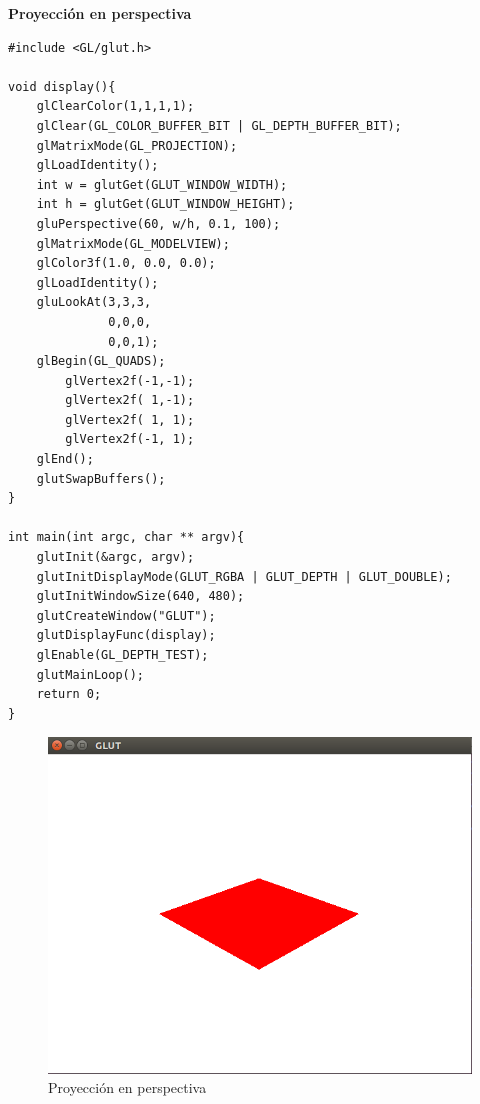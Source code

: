 \documentclass[a4paper,12pt]{article}
\begin{document}
\begin{enumerate}
\begin{itemize}
  \textbf{Proyección en perspectiva}
  
  \begin{lstlisting}
#include <GL/glut.h>

void display(){
    glClearColor(1,1,1,1);
    glClear(GL_COLOR_BUFFER_BIT | GL_DEPTH_BUFFER_BIT);
    glMatrixMode(GL_PROJECTION);
    glLoadIdentity();
    int w = glutGet(GLUT_WINDOW_WIDTH);
    int h = glutGet(GLUT_WINDOW_HEIGHT);
    gluPerspective(60, w/h, 0.1, 100);
    glMatrixMode(GL_MODELVIEW);
    glColor3f(1.0, 0.0, 0.0);
    glLoadIdentity();
    gluLookAt(3,3,3,
              0,0,0,
              0,0,1);
    glBegin(GL_QUADS);
        glVertex2f(-1,-1);
        glVertex2f( 1,-1);
        glVertex2f( 1, 1);
        glVertex2f(-1, 1);
    glEnd();
    glutSwapBuffers();
}

int main(int argc, char ** argv){
    glutInit(&argc, argv);
    glutInitDisplayMode(GLUT_RGBA | GLUT_DEPTH | GLUT_DOUBLE);
    glutInitWindowSize(640, 480);
    glutCreateWindow("GLUT");
    glutDisplayFunc(display);
    glEnable(GL_DEPTH_TEST);
    glutMainLoop();
    return 0;
}
  \end{lstlisting}
  \begin{figure}[H]
   \centering
   \includegraphics[scale = 0.5]{5.png}
   \caption{Proyección en perspectiva}
  \end{figure}
 \end{itemize}
\end{enumerate}
\end{document}
